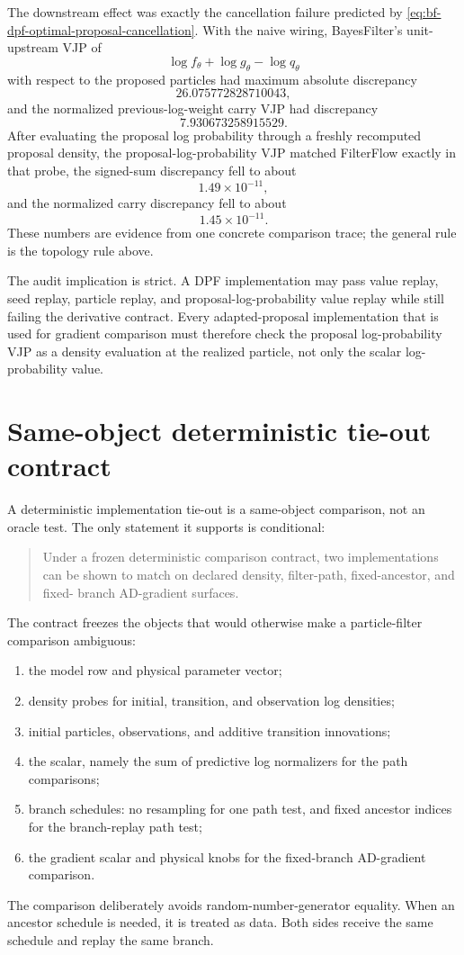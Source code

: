 The downstream effect was exactly the cancellation failure predicted by
\eqref{eq:bf-dpf-optimal-proposal-cancellation}.  With the naive wiring,
BayesFilter's unit-upstream VJP of
\[
  \log f_\theta+\log g_\theta-\log q_\theta
\]
with respect to the proposed particles had maximum absolute discrepancy
\[
  26.075772828710043 ,
\]
and the normalized previous-log-weight carry VJP had discrepancy
\[
  7.930673258915529 .
\]
After evaluating the proposal log probability through a freshly recomputed
proposal density, the proposal-log-probability VJP matched FilterFlow exactly
in that probe, the signed-sum discrepancy fell to about
\[
  1.49\times 10^{-11},
\]
and the normalized carry discrepancy fell to about
\[
  1.45\times 10^{-11}.
\]
These numbers are evidence from one concrete comparison trace; the general rule
is the topology rule above.

The audit implication is strict.  A DPF implementation may pass value replay,
seed replay, particle replay, and proposal-log-probability value replay while
still failing the derivative contract.  Every adapted-proposal implementation
that is used for gradient comparison must therefore check the proposal
log-probability VJP as a density evaluation at the realized particle, not only
the scalar log-probability value.

\section{Same-object deterministic tie-out contract}
\label{sec:bf-dpf-bf-filterflow-deterministic-tieout}

A deterministic implementation tie-out is a same-object comparison, not an
oracle test.  The only statement it supports is conditional:

\begin{quote}
Under a frozen deterministic comparison contract, two implementations can be
shown to match on declared density, filter-path, fixed-ancestor, and fixed-
branch AD-gradient surfaces.
\end{quote}

The contract freezes the objects that would otherwise make a particle-filter
comparison ambiguous:
\begin{enumerate}[label=(\roman*)]
  \item the model row and physical parameter vector;
  \item density probes for initial, transition, and observation log densities;
  \item initial particles, observations, and additive transition innovations;
  \item the scalar, namely the sum of predictive log normalizers for the path
    comparisons;
  \item branch schedules: no resampling for one path test, and fixed ancestor
    indices for the branch-replay path test;
  \item the gradient scalar and physical knobs for the fixed-branch AD-gradient
    comparison.
\end{enumerate}
The comparison deliberately avoids random-number-generator equality.  When an
ancestor schedule is needed, it is treated as data.  Both sides receive the same
schedule and replay the same branch.

